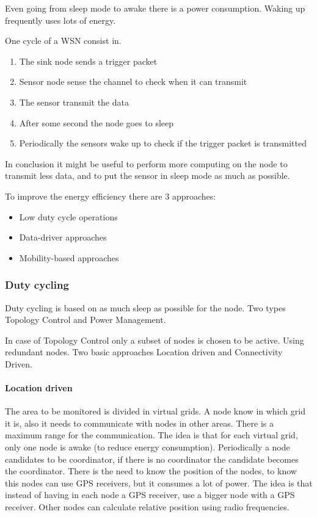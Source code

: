 \documentclass[]{article}
\begin{document}
Even going from sleep mode to awake there is a power consumption. Waking up frequently uses lots of energy. 

One cycle of  a WSN consist in.
\begin{enumerate}
	\item The sink node sends a trigger packet
	\item Sensor node sense the channel to check when it can transmit
	\item The sensor transmit the data
	\item After some second the node goes to sleep
	\item Periodically the sensors wake up to check if the trigger packet is transmitted
\end{enumerate}

In conclusion it might be useful to perform more computing on the node to transmit less data, and to put the sensor in sleep mode as much as possible.

To improve the energy efficiency there are 3 approaches:
\begin{itemize}
	\item Low duty cycle operations
	\item Data-driver approaches
	\item Mobility-based approaches
\end{itemize}

\subsubsection{Duty cycling}
Duty cycling is based on as much sleep as possible for the node. Two types Topology Control and Power Management.

In case of Topology Control only a subset of nodes is chosen to be active. Using redundant nodes. Two basic approaches Location driven and Connectivity Driven. 
\paragraph{Location driven}
The area to be monitored is divided in virtual grids. A node know in which grid it is, also it needs to communicate with nodes in other areas. There is a maximum range for the communication. The idea is that for each virtual grid, only one node is awake (to reduce energy consumption). Periodically a node candidates to be coordinator, if there is no coordinator the candidate becomes the coordinator. There is the need to know the position of the nodes, to know this nodes can use GPS receivers, but it consumes a lot of power. The idea is that instead of having in each node a GPS receiver, use a bigger node with a GPS receiver. Other nodes can calculate relative position using radio frequencies.
\end{document}
